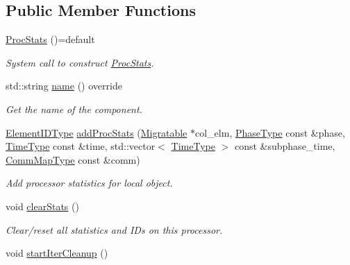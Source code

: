 \subsection*{Public Member Functions}
\begin{DoxyCompactItemize}
\item 
\hyperlink{structvt_1_1vrt_1_1collection_1_1balance_1_1_proc_stats_aa3495f8e610964b594e6dc4d3998d5b2}{Proc\+Stats} ()=default
\begin{DoxyCompactList}\small\item\em System call to construct {\ttfamily \hyperlink{structvt_1_1vrt_1_1collection_1_1balance_1_1_proc_stats}{Proc\+Stats}}. \end{DoxyCompactList}\item 
std\+::string \hyperlink{structvt_1_1vrt_1_1collection_1_1balance_1_1_proc_stats_a19a950a19ad62c0dddff07d50d060114}{name} () override
\begin{DoxyCompactList}\small\item\em Get the name of the component. \end{DoxyCompactList}\item 
\hyperlink{namespacevt_1_1vrt_1_1collection_1_1balance_a14c8d2c972f2913aa3f1636e5be0a120}{Element\+I\+D\+Type} \hyperlink{structvt_1_1vrt_1_1collection_1_1balance_1_1_proc_stats_a21164188d5d1d09724959e95e5c4f2e4}{add\+Proc\+Stats} (\hyperlink{structvt_1_1vrt_1_1collection_1_1_migratable}{Migratable} $\ast$col\+\_\+elm, \hyperlink{namespacevt_a46ce6733d5cdbd735d561b7b4029f6d7}{Phase\+Type} const \&phase, \hyperlink{namespacevt_a876a9d0cd5a952859c72de8a46881442}{Time\+Type} const \&time, std\+::vector$<$ \hyperlink{namespacevt_a876a9d0cd5a952859c72de8a46881442}{Time\+Type} $>$ const \&subphase\+\_\+time, \hyperlink{namespacevt_1_1vrt_1_1collection_1_1balance_aa50d4cbbfa3c643e7303fc6e08f411fb}{Comm\+Map\+Type} const \&comm)
\begin{DoxyCompactList}\small\item\em Add processor statistics for local object. \end{DoxyCompactList}\item 
void \hyperlink{structvt_1_1vrt_1_1collection_1_1balance_1_1_proc_stats_a9a47e5d00d2645f76f2a21e75996fe8b}{clear\+Stats} ()
\begin{DoxyCompactList}\small\item\em Clear/reset all statistics and I\+Ds on this processor. \end{DoxyCompactList}\item 
void \hyperlink{structvt_1_1vrt_1_1collection_1_1balance_1_1_proc_stats_a6b8af21b777599060c4a532a5adb0100}{start\+Iter\+Cleanup} ()

\end{DoxyCompactItemize}
